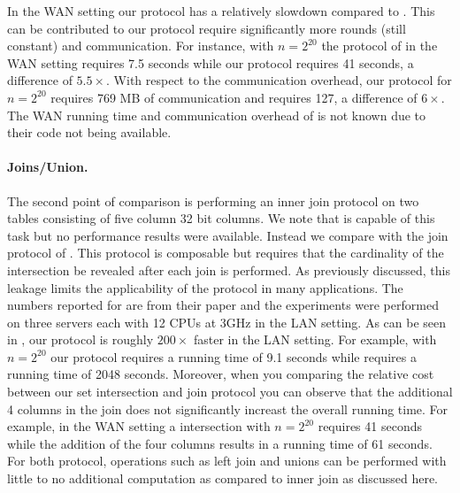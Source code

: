 In the WAN setting our protocol has a relatively slowdown compared to \cite{CCS:KKRT16}. This can be contributed to our protocol require significantly more rounds (still constant) and communication. For instance, with $n=2^{20}$ the protocol of \cite{CCS:KKRT16} in the WAN setting requires 7.5 seconds while our protocol requires 41 seconds, a difference of $5.5\times$. With respect to the communication overhead, our protocol for $n=2^{20}$ requires 769 MB of communication and \cite{CCS:KKRT16} requires 127, a difference of $6\times$. The WAN running time and communication overhead of \cite{ASIACCS:BlaAgu12} is not known due to their code not being available.


\paragraph{Joins/Union. } The second point of comparison is performing an inner join protocol on two tables consisting of five column 32 bit columns. We note that \cite{ASIACCS:BlaAgu12} is capable of this task but no performance results were available. Instead we compare with the join protocol of \cite{LTW13}. This protocol is composable but requires that the cardinality of the intersection be revealed after each join is performed. As previously discussed, this leakage limits the applicability of the protocol in many applications. The numbers reported for \cite{LTW13} are from their paper and the experiments were performed on three servers each with 12 CPUs at 3GHz in the LAN setting. As can be seen in , our protocol is roughly $200\times$ faster in the LAN setting. For example, with $n=2^{20}$ our protocol requires a running time of 9.1 seconds while \cite{LTW13} requires a running time of 2048 seconds. Moreover, when you comparing the relative cost between our set intersection and join protocol you can observe that the additional 4 columns in the join does not significantly increast the overall running time. For example, in the WAN setting a intersection with $n=2^{20}$ requires 41 seconds while the addition of the four columns results in a  running time of 61 seconds. For both protocol, operations such as left join and unions can be performed with little to no additional computation as compared to inner join as discussed here.


